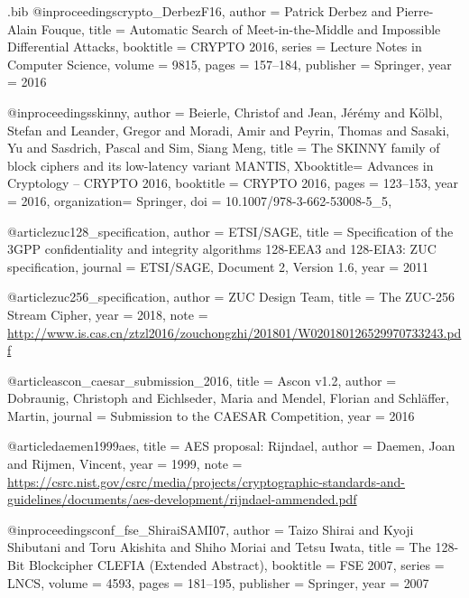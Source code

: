 \documentclass[table,aspectratio=169]{beamer}
\begin{document}
\begin{filecontents*}[overwrite]{\jobname.bib}
@inproceedings{crypto_DerbezF16,
  author    = {Patrick Derbez and
               Pierre{-}Alain Fouque},
  title     = {Automatic Search of Meet-in-the-Middle and Impossible Differential
               Attacks},
  booktitle = {{CRYPTO} 2016},
  series    = {Lecture Notes in Computer Science},
  volume    = {9815},
  pages     = {157--184},
  publisher = {Springer},
  year      = {2016}
}

@inproceedings{skinny,  
  author    = {Beierle, Christof and 
              Jean, J{\'e}r{\'e}my and 
              K{\"o}lbl, Stefan and 
              Leander, Gregor and 
              Moradi, Amir and 
              Peyrin, Thomas and 
              Sasaki, Yu and 
              Sasdrich, Pascal and 
              Sim, Siang Meng},
  title     = {{The SKINNY family of block ciphers and its low-latency variant MANTIS}},
  Xbooktitle= {Advances in Cryptology -- CRYPTO 2016},
  booktitle = {{CRYPTO} 2016},
  pages     = {123--153},
  year      = {2016},
  organization= {Springer},
  doi       = {10.1007/978-3-662-53008-5_5},
}

@article{zuc128_specification,
	author    = {ETSI/SAGE},
	title     = {Specification of the 3GPP confidentiality and integrity algorithms
	{128-EEA3} and {128-EIA3}: {ZUC} specification},
	journal   = {ETSI/SAGE, Document 2, Version 1.6},
	year      = {2011}
}

@article{zuc256_specification,
	author    = {ZUC Design Team},
	title     = {The {ZUC}-256 Stream Cipher},
	year      = {2018},
	note      = {\url{http://www.is.cas.cn/ztzl2016/zouchongzhi/201801/W020180126529970733243.pdf}}
}

@article{ascon_caesar_submission_2016,
	title     = {Ascon v1.2},
	author    = {Dobraunig, Christoph and Eichlseder, Maria and Mendel, Florian and Schl{\"a}ffer, Martin},
	journal   = {Submission to the CAESAR Competition},
	year      = {2016}
}

@article{daemen1999aes,
	title     = {{AES} proposal: {Rijndael}},
	author    = {Daemen, Joan and Rijmen, Vincent},
	year      = {1999},
	note      = {\url{https://csrc.nist.gov/csrc/media/projects/cryptographic-standards-and-guidelines/documents/aes-development/rijndael-ammended.pdf}}
}

@inproceedings{conf_fse_ShiraiSAMI07,
  author    = {Taizo Shirai and
               Kyoji Shibutani and
               Toru Akishita and
               Shiho Moriai and
               Tetsu Iwata},
  title     = {The 128-Bit Blockcipher {CLEFIA} (Extended Abstract)},
  booktitle = {{FSE} 2007},
  series    = {LNCS},
  volume    = {4593},
  pages     = {181--195},
  publisher = {Springer},
  year      = {2007}
}


\end{filecontents*}
\end{document}
